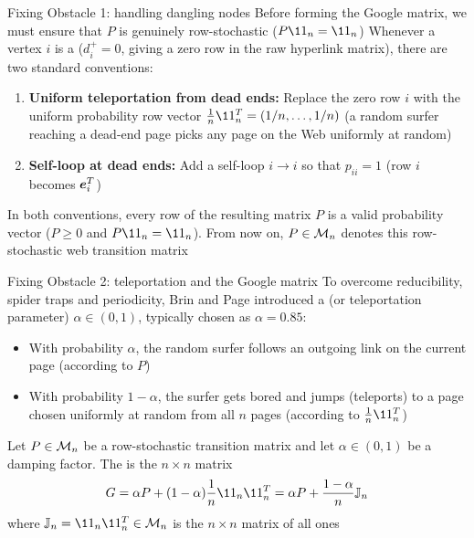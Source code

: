 \documentclass[aspectratio=169]{beamer}\usepackage[]{graphicx}\usepackage[]{xcolor}
\begin{document}
\begin{frame}{Fixing Obstacle 1: handling dangling nodes}
Before forming the Google matrix, we must ensure that $P$ is genuinely row-stochastic ($P\11_n = \11_n$)
\vfill
Whenever a vertex $i$ is a  ($d_i^+ = 0$, giving a zero row in the raw hyperlink matrix), there are two standard conventions:
\begin{enumerate}
\item \textbf{Uniform teleportation from dead ends:} Replace the zero row $i$ with the uniform probability row vector $\frac{1}{n}\11_n^T = (1/n, \ldots, 1/n)$ (a random surfer reaching a dead-end page picks any page on the Web uniformly at random)
\item \textbf{Self-loop at dead ends:} Add a self-loop $i \to i$ so that $p_{ii} = 1$ (row $i$ becomes $\bm{e}_i^T$)
\end{enumerate}
\vfill
In both conventions, every row of the resulting matrix $P$ is a valid probability vector ($P \ge 0$ and $P\11_n = \11_n$). From now on, $P \in \mathcal{M}_n$ denotes this row-stochastic web transition matrix
\end{frame}

\begin{frame}{Fixing Obstacle 2: teleportation and the Google matrix}
To overcome reducibility, spider traps and periodicity, Brin and Page introduced a  (or teleportation parameter) $\alpha \in (0, 1)$, typically chosen as $\alpha = 0.85$:
\begin{itemize}
\item With probability $\alpha$, the random surfer follows an outgoing link on the current page (according to $P$)
\item With probability $1 - \alpha$, the surfer gets bored and jumps (teleports) to a page chosen uniformly at random from all $n$ pages (according to $\frac{1}{n}\11_n^T$)
\end{itemize}
\vfill
\begin{importantdefinition}
Let $P \in \mathcal{M}_n$ be a row-stochastic transition matrix and let $\alpha \in (0, 1)$ be a damping factor. The  is the $n \times n$ matrix
\[
G = \alpha P + (1 - \alpha)\frac{1}{n}\11_n \11_n^T = \alpha P + \frac{1 - \alpha}{n}\IJ_n
\]
where $\IJ_n = \11_n \11_n^T \in \M_n$ is the $n \times n$ matrix of all ones
\end{importantdefinition}
\end{frame}
\end{document}
